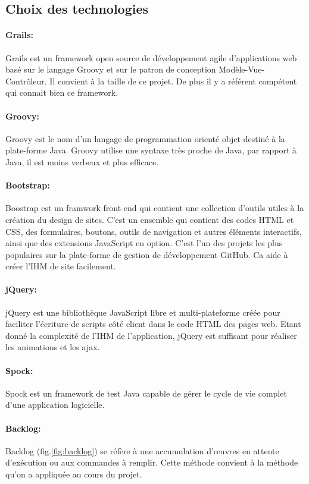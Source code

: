 \subsection{Choix des technologies}

\paragraph{Grails:}
Grails est un framework open source de développement agile d'applications web basé sur le langage Groovy et sur le patron de conception Modèle-Vue-Contrôleur.
Il convient à la taille de ce projet.
De plus il y a référent compétent qui connait bien ce framework.
\paragraph{Groovy:}
Groovy est le nom d'un langage de programmation orienté objet destiné à la plate-forme Java.
Groovy utilise une syntaxe très proche de Java, par rapport à Java, il est moins verbeux et plus efficace.
\paragraph{Bootstrap:}
Boostrap est un framwork front-end qui contient une collection d'outils utiles à la création du design de sites.
C'est un ensemble qui contient des codes HTML et CSS, des formulaires, boutons, outils de navigation et autres éléments interactifs, ainsi que des extensions JavaScript en option. C'est l'un des projets les plus populaires sur la plate-forme de gestion de développement GitHub.
Ca aide à créer l'IHM de site facilement.
\paragraph{jQuery:}
jQuery est une bibliothèque JavaScript libre et multi-plateforme créée pour faciliter l'écriture de scripts côté client dans le code HTML des pages web.
Etant donné la complexité de l'IHM de l'application, jQuery est suffisant pour réaliser les animations et les ajax.
\paragraph{Spock:}
Spock est un framework de test Java capable de gérer le cycle de vie complet d'une application logicielle.
\paragraph{Backlog:}
Backlog (fig.\ref{fig:backlog}) se réfère à une accumulation d'œuvres en attente d'exécution ou aux commandes à remplir.
Cette méthode convient à la méthode qu'on a appliquée au cours du projet.

